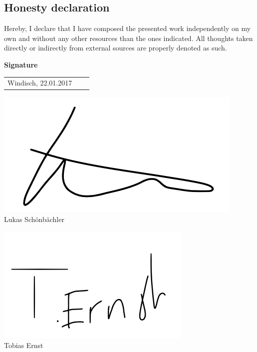 \documentclass[11pt]{article} %
\begin{document}
\begin{appendices}
\section{Honesty declaration}

Hereby, I declare that I have composed the presented work independently on my own and without any other resources than the ones indicated. All thoughts taken directly or indirectly from external sources are properly denoted as such.
\newline

\textbf{Signature} \newline


\vspace{0.5 cm} 
\begin{tabular}{p{7cm}p{1.5cm}l}
Windisch, 22.01.2017
\end{tabular}%
 \vspace{1 cm} 

\includegraphics[]{lukas}\\
Lukas Schönbächler

\includegraphics[]{tobias}\\
Tobias Ernst

\newpage

\end{appendices}
\end{document}
